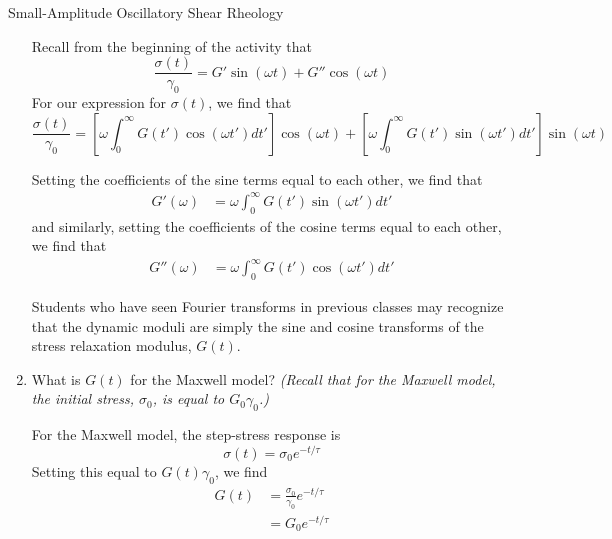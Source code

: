 \begin{activity}[extension]{Small-Amplitude Oscillatory Shear Rheology}
\begin{exercises}
\begin{enumerate}
\begin{solution}{}
						Recall from the beginning of the activity that
						\begin{equation*}
							\frac{\sigma(t)}{\gamma_0} = G' \sin(\omega t) + G'' \cos(\omega t)
						\end{equation*}
						For our expression for $\sigma(t)$, we find that
						\begin{equation*}
							\frac{\sigma(t)}{\gamma_0} = \left[ \omega \int_0^{\infty} G(t') \cos(\omega t')dt'\right]\cos(\omega t) + \left[ \omega \int_0^{\infty} G(t') \sin(\omega t') dt'\right]\sin(\omega t)
						\end{equation*}
						
						Setting the coefficients of the sine terms equal to each other, we find that
						\begin{align*}
							G'(\omega) &= \omega \int_0^{\infty} G(t') \sin(\omega t') dt'
						\end{align*}
						and similarly, setting the coefficients of the cosine terms equal to each other, we find that
						\begin{align*}
							G''(\omega) &= \omega \int_0^{\infty} G(t') \cos(\omega t')dt'
						\end{align*}
						
						Students who have seen Fourier transforms in previous classes may recognize that the dynamic moduli are simply the sine and cosine transforms of the stress relaxation modulus, $G(t)$.
						
					\end{solution}
			
				\item What is $G(t)$ for the Maxwell model? \emph{(Recall that for the Maxwell model, the initial stress, $\sigma_0$, is equal to $G_0\gamma_0$.)}
				
					\begin{solution}{}
						For the Maxwell model, the step-stress response is
						\begin{equation*}
							\sigma(t) = \sigma_0 e^{-t/\tau}
						\end{equation*}
						Setting this equal to $G(t)\gamma_0$, we find
						\begin{align*}
							G(t) &= \frac{\sigma_0}{\gamma_0} e^{-t/\tau}\\
								&= G_0 e^{-t/\tau}
						\end{align*}
					\end{solution}
			

\end{enumerate}
\end{exercises}
\end{activity}
